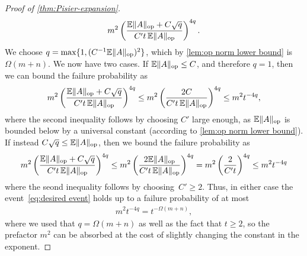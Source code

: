 \documentclass[aos]{imsart}
\theoremstyle{definition}
\numberwithin{equation}{section}
\DeclareMathOperator{\op}{op}
\DeclarePairedDelimiter{\norm}{\lVert}{\rVert}
\newcommand{\E}{\mathbb{E}}
\begin{document}
\begin{appendix}
\begin{proof} [Proof of \cref{thm:Pisier-expansion}]
\begin{align*}
  m^2 \left( \frac{\E\norm A_{\op} + C \sqrt{q}}{C' t \, \E \norm{A}_{\op}} \right)^{4q}.
\end{align*}
We choose $q = \max\{1, (C^{-1} \E \norm{A}_{\op})^{2} \}$, which by \cref{lem:op norm lower bound} is $\Omega(m + n)$.
We now have two cases.
If $\E \norm{A}_{\op} \leq C$, and therefore $q = 1$, then we can bound the failure probability as
\begin{align*}
  m^2 \left( \frac{\E\norm A_{\op} + C \sqrt{q}}{C' t \, \E \norm{A}_{\op}} \right)^{4q}
\leq m^2 \left( \frac{2C}{C' t \, \E \norm{A}_{\op}} \right)^{4q}
\leq m^2 t^{-4q},
\end{align*}
where the second inequality follows by choosing $C'$ large enough, as $\E\norm A_{\op}$ is bounded below by a universal constant (according to \cref{lem:op norm lower bound}).
If instead $C \sqrt{q} \leq \E \norm{A}_{\op}$, then we bound the failure probability as
\begin{align*}
  m^2 \left( \frac{\E\norm A_{\op} + C \sqrt{q}}{C' t \, \E \norm{A}_{\op}} \right)^{4q}
\leq m^2 \left( \frac{2 \E\norm A_{\op}}{C' t \, \E \norm{A}_{\op}} \right)^{4q}
= m^2 \left( \frac{2}{C' t} \right)^{4q}
\leq m^2 t^{-4q}
\end{align*}
where the seond inequality follows by choosing~$C'\geq2$.
Thus, in either case the event~\eqref{eq:desired event} holds up to a failure probability of at most
\begin{align*}
  m^2 t^{-4q} = t^{-\Omega(m+n)},
\end{align*}
where we used that $q = \Omega(m + n)$ as well as the fact that $t\geq2$, so the prefactor $m^{2}$ can be absorbed at the cost of slightly changing the constant in the exponent.
\end{proof}



\end{appendix}
\end{document}
